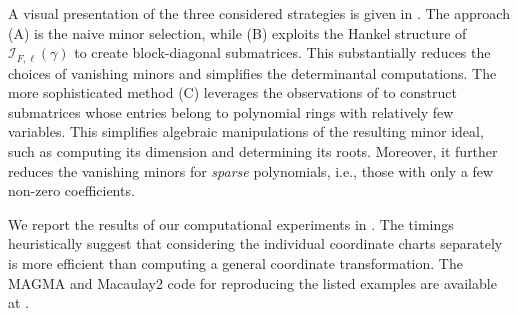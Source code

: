 \documentclass{amsart}
\theoremstyle{plain}
\numberwithin{equation}{section}
\begin{document}
A visual presentation of the three considered strategies is given in .
The approach (A) is the naive minor selection, while (B) exploits the Hankel structure of $\mathcal{I}_{F,\ell}(\gamma)$ to create block-diagonal submatrices.
This substantially reduces the choices of vanishing minors and simplifies the determinantal computations.
The more sophisticated method (C) leverages the observations of  to construct submatrices whose entries belong to polynomial rings with relatively few variables.
This simplifies algebraic manipulations of the resulting minor ideal, such as computing its dimension and determining its roots.
Moreover, it further reduces the vanishing minors for \emph{sparse} polynomials, i.e., those with only a few non-zero coefficients.

We report the results of our computational experiments in .
The timings heuristically suggest that considering the individual coordinate charts separately is more efficient than computing a general coordinate transformation.
The MAGMA \cite{magma} and Macaulay2 \cite{M2} code for reproducing the listed examples are available at \cite{code}.
\end{document}
